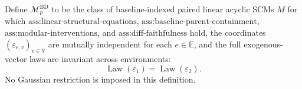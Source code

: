 Define \(\mathcal M_p^{\mathrm{BD}}\) to be the class of baseline-indexed paired linear acyclic SCMs \(M\) for which \(\text{ass:linear-structural-equations}\), \(\text{ass:baseline-parent-containment}\), \(\text{ass:modular-interventions}\), and \(\text{ass:diff-faithfulness}\) hold, the coordinates \((\varepsilon_{e,v})_{v\in\mathbb V}\) are mutually independent for each \(e\in\mathbb E\), and the full exogenous-vector laws are invariant across environments:
\[
 \operatorname{Law}(\varepsilon_1)=\operatorname{Law}(\varepsilon_2).
\]
No Gaussian restriction is imposed in this definition.